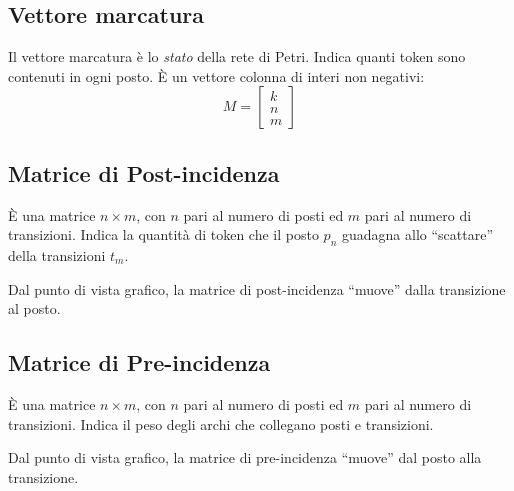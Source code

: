 \documentclass[a4paper]{report}
\begin{document}
\subsection{Vettore marcatura}
Il vettore marcatura \`e lo {\em stato} della rete di Petri. Indica
quanti token sono contenuti in ogni posto. \`E un vettore colonna di
interi non negativi:
\[
M = 
 \begin{bmatrix}
  k\\
  n\\
  m
 \end{bmatrix}
\]

\subsection{Matrice di Post-incidenza}
\`E una matrice $n \times m$, con $n$ pari al numero di posti ed $m$
pari al numero di transizioni. Indica la quantit\`a di token che il
posto $p_n$ guadagna allo ``scattare'' della transizioni $t_m$.

Dal punto di vista grafico, la matrice di post-incidenza ``muove''
dalla transizione al posto.

\subsection{Matrice di Pre-incidenza}
\`E una matrice $n \times m$, con $n$ pari al numero di posti ed $m$
pari al numero di transizioni. Indica il peso degli archi che
collegano posti e transizioni. 

Dal punto di vista grafico, la matrice di pre-incidenza ``muove''
dal posto alla transizione.
\end{document}
